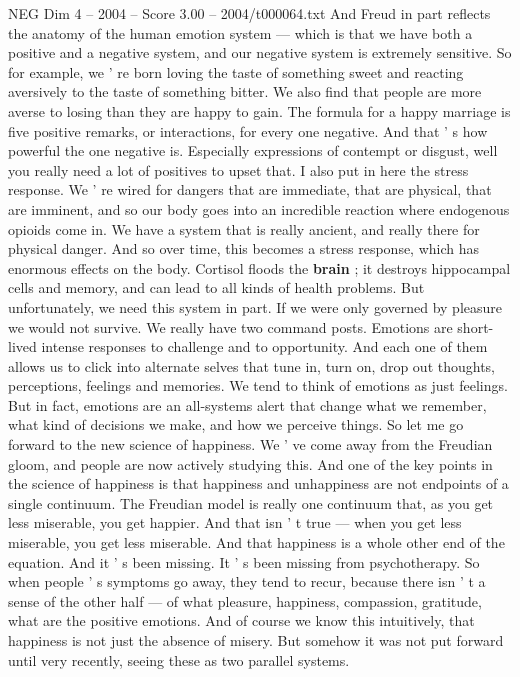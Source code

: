 \begin{textsample}{NEG Dim 4 – 2004 – Score 3.00 – 2004/t000064.txt}
And Freud in part reflects the anatomy of the human emotion system — which is that we have both a positive and a negative system, and our negative system is extremely sensitive.
So for example, we ' re born loving the taste of something sweet and reacting aversively to the taste of something bitter.
We also find that people are more averse to losing than they are happy to gain.
The formula for a happy marriage is five positive remarks, or interactions, for every one negative.
And that ' s how powerful the one negative is.
Especially expressions of contempt or disgust, well you really need a lot of positives to upset that.
I also put in here the stress response.
We ' re wired for dangers that are immediate, that are physical, that are imminent, and so our body goes into an incredible reaction where endogenous opioids come in.
We have a system that is really ancient, and really there for physical danger.
And so over time, this becomes a stress response, which has enormous effects on the body.
Cortisol floods the \textbf{brain} ; it destroys hippocampal cells and memory, and can lead to all kinds of health problems.
But unfortunately, we need this system in part.
If we were only governed by pleasure we would not survive.
We really have two command posts.
Emotions are short-lived intense responses to challenge and to opportunity.
And each one of them allows us to click into alternate selves that tune in, turn on, drop out thoughts, perceptions, feelings and memories.
We tend to think of emotions as just feelings.
But in fact, emotions are an all-systems alert that change what we remember, what kind of decisions we make, and how we perceive things.
So let me go forward to the new science of happiness.
We ' ve come away from the Freudian gloom, and people are now actively studying this.
And one of the key points in the science of happiness is that happiness and unhappiness are not endpoints of a single continuum.
The Freudian model is really one continuum that, as you get less miserable, you get happier.
And that isn ' t true — when you get less miserable, you get less miserable.
And that happiness is a whole other end of the equation.
And it ' s been missing.
It ' s been missing from psychotherapy.
So when people ' s symptoms go away, they tend to recur, because there isn ' t a sense of the other half — of what pleasure, happiness, compassion, gratitude, what are the positive emotions.
And of course we know this intuitively, that happiness is not just the absence of misery.
But somehow it was not put forward until very recently, seeing these as two parallel systems.

\end{textsample}
